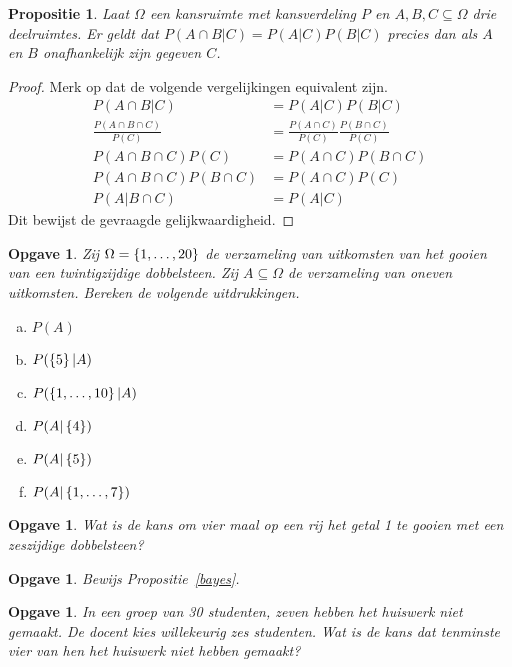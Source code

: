\documentclass[a4paper]{book}
\newtheorem{proposition}[theorem]{Propositie}
\newtheorem{exercise}[theorem]{Opgave}
\theoremstyle{definition}
\begin{document}
\begin{proposition}
    Laat $\Omega$ een kansruimte met kansverdeling $P$ en $A,B,C \subseteq \Omega$ drie deelruimtes.
    Er geldt dat $P(A \cap B|C) = P(A|C)P(B|C)$ precies dan als $A$ en $B$ onafhankelijk zijn gegeven $C$.
\end{proposition}
\begin{proof}
    Merk op dat de volgende vergelijkingen equivalent zijn.
    \begin{align*}
        P(A \cap B|C)                       &= P(A|C)P(B|C) \\
        \frac{P(A \cap B \cap C)}{P(C)}     &= \frac{P(A \cap C)}{P(C)} \frac{P(B \cap C)}{P(C)} \\
        P(A \cap B \cap C)P(C)              &= P(A \cap C)P(B \cap C) \\
        P(A \cap B \cap C)P(B \cap C)       &= P(A \cap C)P(C) \\
        P(A | B \cap C)                     &= P(A | C)
    \end{align*}
    Dit bewijst de gevraagde gelijkwaardigheid.
\end{proof}


\begin{exercise}
    Zij $\Omega = \set{1,\dots,20}$ de verzameling van uitkomsten van het gooien van een twintigzijdige dobbelsteen.
    Zij $A \subseteq \Omega$ de verzameling van oneven uitkomsten.
    Bereken de volgende uitdrukkingen.
    \begin{enumerate}[a.]
        \item $P(A)$
        \item $P(\set{5}|A)$
        \item $P(\set{1,\dots,10}|A)$
        \item $P(A|\set{4})$
        \item $P(A|\set{5})$
        \item $P(A|\set{1,\dots,7})$
    \end{enumerate}
\end{exercise}

\begin{exercise}
Wat is de kans om vier maal op een rij het getal 1 te gooien met een zeszijdige dobbelsteen?
\end{exercise}

\begin{exercise}
    Bewijs Propositie~\ref{bayes}.
\end{exercise}

\begin{exercise}
In een groep van 30 studenten, zeven hebben het huiswerk niet gemaakt. De docent kies willekeurig zes studenten.
Wat is de kans dat tenminste vier van hen het huiswerk niet hebben gemaakt?
\end{exercise}
\end{document}
